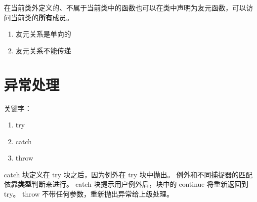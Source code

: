 在当前类外定义的、不属于当前类中的函数也可以在类中声明为友元函数，可以访问当前类的\textbf{所有}成员。

\begin{enumerate}
    \item 友元关系是单向的
    \item 友元关系不能传递
\end{enumerate}

\section{异常处理}

关键字：
\begin{enumerate}
    \item try
    \item catch
    \item throw
\end{enumerate}

catch 块定义在 try 块之后，因为例外在 try 块中抛出。
例外和不同捕捉器的匹配依靠\textbf{类型}判断来进行。
catch 块提示用户例外后，块中的 continue 将重新返回到 try。
throw 不带任何参数，重新抛出异常给上级处理。

\newpage
